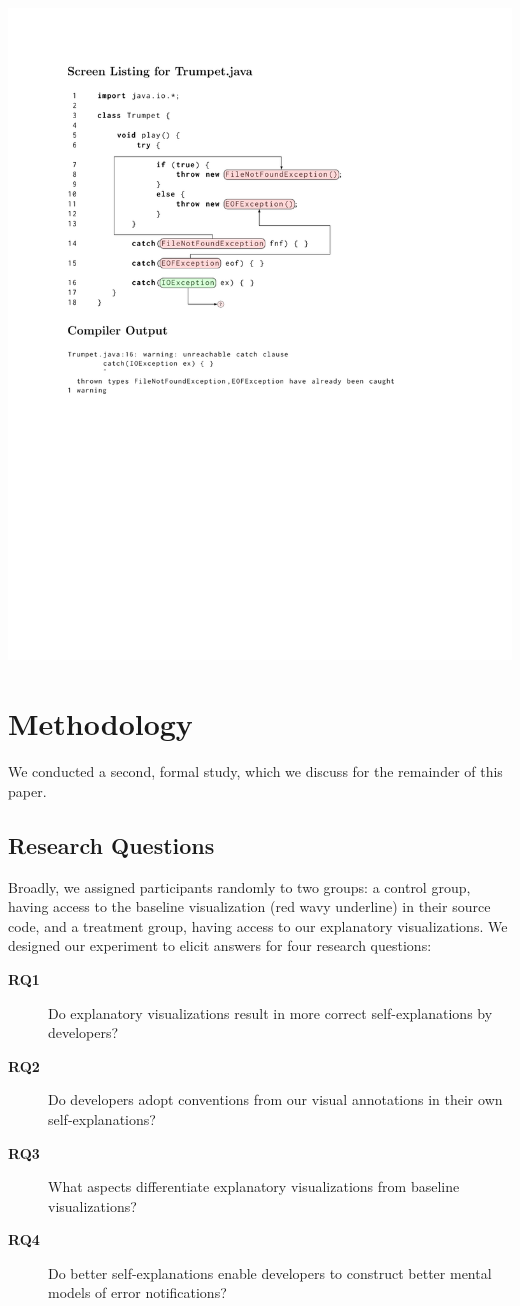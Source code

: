 \documentclass[conference]{IEEEtran}
\begin{document}
\includegraphics{trumpet_explain_crop.pdf}

\section{Methodology}

We conducted a second, formal study, which we discuss for the remainder of this paper.

\subsection{Research Questions}

Broadly, we assigned participants randomly to two groups: a control group, having access to the baseline visualization (red wavy underline) in their source code, and a treatment group, having access to our explanatory visualizations. We designed our experiment to elicit answers for four research questions:

\begin{description}
\item[\textbf{RQ1}] Do explanatory visualizations result in more correct self-explanations by developers?
\item[\textbf{RQ2}] Do developers adopt conventions from our visual annotations in their own self-explanations?
\item[\textbf{RQ3}] What aspects differentiate explanatory visualizations from baseline visualizations?
\item[\textbf{RQ4}] Do better self-explanations enable developers to construct better mental models of error notifications?
\end{description}
\end{document}
